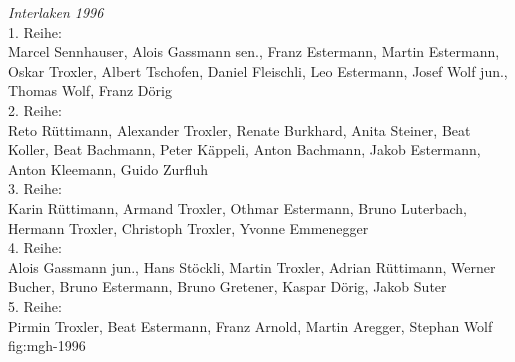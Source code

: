 {\emph{Interlaken 1996}\\
    1. Reihe:\\
    Marcel Sennhauser, Alois Gassmann sen., Franz Estermann, Martin Estermann,
    Oskar Troxler, Albert Tschofen, Daniel Fleischli, Leo Estermann, Josef Wolf
    jun., Thomas Wolf, Franz Dörig\\
    2. Reihe:\\
    Reto Rüttimann, Alexander Troxler, Renate Burkhard, Anita Steiner, Beat
    Koller, Beat Bachmann, Peter Käppeli, Anton Bachmann, Jakob Estermann, Anton
    Kleemann, Guido Zurfluh\\
    3. Reihe:\\
    Karin Rüttimann, Armand Troxler, Othmar Estermann, Bruno Luterbach, Hermann
    Troxler, Christoph Troxler, Yvonne Emmenegger\\
    4. Reihe:\\
    Alois Gassmann jun., Hans Stöckli, Martin Troxler, Adrian Rüttimann, Werner
    Bucher, Bruno Estermann, Bruno Gretener, Kaspar Dörig, Jakob Suter\\
    5. Reihe:\\
    Pirmin Troxler, Beat Estermann, Franz Arnold, Martin Aregger, Stephan Wolf }
{fig:mgh-1996}



